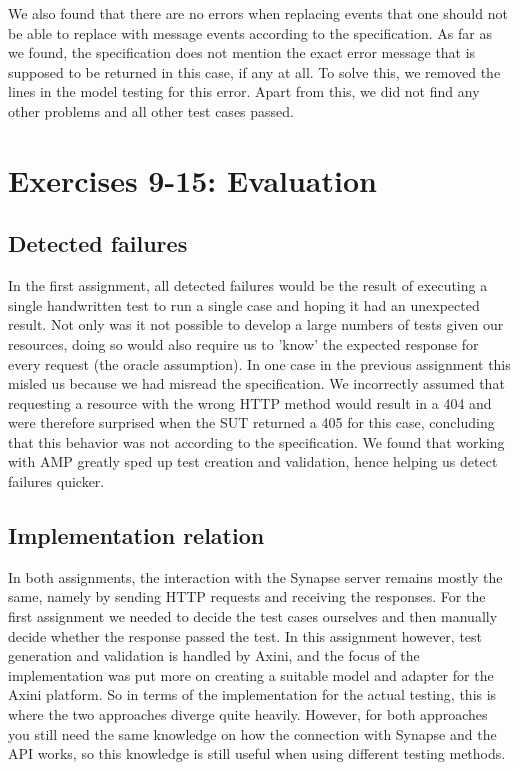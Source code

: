\documentclass[a4paper]{article}
\begin{document}
We also found that there are no errors when replacing events that one should not be able to replace with message events according to the specification. As far as we found, the specification does not mention the exact error message that is supposed to be returned in this case, if any at all. To solve this, we removed the lines in the model testing for this error. Apart from this, we did not find any other problems and all other test cases passed.

\section{Exercises 9-15: Evaluation} \label{exercises-9-15-evaluation}
\subsection{Detected failures} \label{detected-failures}
In the first assignment, all detected failures would be the result of executing a single handwritten test to run a single case and hoping it had an unexpected result. Not only was it not possible to develop a large numbers of tests given our resources, doing so would also require us to 'know' the expected response for every request (the oracle assumption). In one case in the previous assignment this misled us because we had misread the specification. We incorrectly assumed that requesting a resource with the wrong HTTP method would result in a 404 and were therefore surprised when the SUT returned a 405 for this case, concluding that this behavior was not according to the specification. We found that working with AMP greatly sped up test creation and validation, hence helping us detect failures quicker.

\subsection{Implementation relation} \label{implementation-relation}
In both assignments, the interaction with the Synapse server remains mostly the same, namely by sending HTTP requests and receiving the responses. For the first assignment we needed to decide the test cases ourselves and then manually decide whether the response passed the test. In this assignment however, test generation and validation is handled by Axini, and the focus of the implementation was put more on creating a suitable model and adapter for the Axini platform. So in terms of the implementation for the actual testing, this is where the two approaches diverge quite heavily. However, for both approaches you still need the same knowledge on how the connection with Synapse and the API works, so this knowledge is still useful when using different testing methods.
\end{document}
